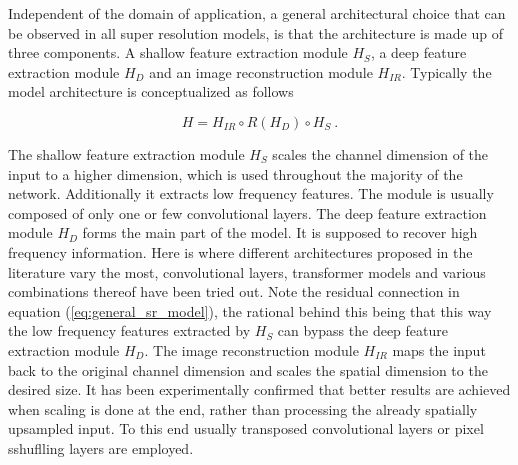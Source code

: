 Independent of the domain of application,
a general architectural choice that can be observed in all super resolution models,
is that the architecture is made up of three components.
A shallow feature extraction module $H_{S}$, a deep feature extraction module $H_{D}$ and an image reconstruction module $H_{IR}$.
Typically the model architecture is conceptualized as follows

    \begin{equation} \label{eq:general_sr_model}
        H = H_{IR} \circ R(H_{D}) \circ H_{S} ~.
    \end{equation}

The shallow feature extraction module $H_{S}$ scales the channel dimension of the input to a higher dimension,
which is used throughout the majority of the network.
Additionally it extracts low frequency features.
The module is usually composed of only one or few convolutional layers. \newline
The deep feature extraction module $H_{D}$ forms the main part of the model.
It is supposed to recover high frequency information.
Here is where different architectures proposed in the literature vary the most,
convolutional layers, transformer models and various combinations thereof have been tried out. \newline
Note the residual connection in equation (\ref{eq:general_sr_model}),
the rational behind this being that this way the low frequency features extracted by $H_S$ can bypass the deep feature extraction module $H_D$. 
The image reconstruction module $H_{IR}$ maps the input back to the original channel dimension
and scales the spatial dimension to the desired size.
It has been experimentally confirmed that better results are achieved when scaling is done at the end,
rather than processing the already spatially upsampled input.
To this end usually transposed convolutional layers or pixel sshuflling layers are employed.
